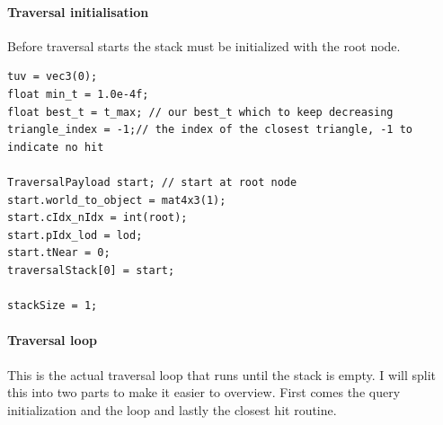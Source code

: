 \paragraph{Traversal initialisation}
Before traversal starts the stack must be initialized with the root node.
\begin{lstlisting}
tuv = vec3(0);
float min_t = 1.0e-4f;
float best_t = t_max; // our best_t which to keep decreasing
triangle_index = -1;// the index of the closest triangle, -1 to indicate no hit

TraversalPayload start; // start at root node
start.world_to_object = mat4x3(1);
start.cIdx_nIdx = int(root);
start.pIdx_lod = lod;
start.tNear = 0;
traversalStack[0] = start;

stackSize = 1;	
\end{lstlisting}
\newpage
\paragraph{Traversal loop}
\label{sec:ImplTraversalLoop}
This is the actual traversal loop that runs until the stack is empty. I will split this into two parts to make it easier to overview. First comes the query initialization  and the loop and lastly the closest hit routine.
